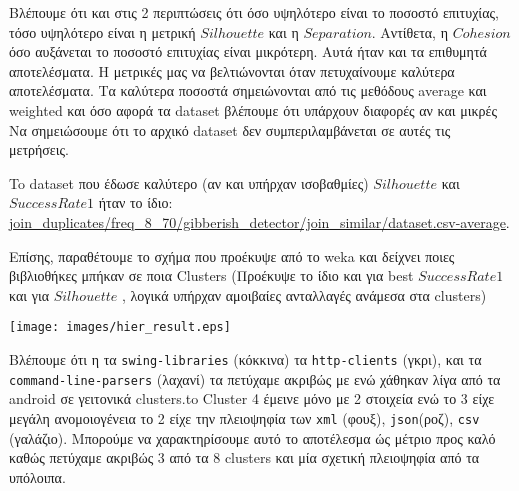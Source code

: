 Βλέπουμε ότι και στις 2 περιπτώσεις ότι όσο υψηλότερο είναι το ποσοστό επιτυχίας,
τόσο υψηλότερο είναι η μετρική $Silhouette$ και η $Separation$.
Αντίθετα, η $Cohesion$ όσο αυξάνεται το ποσοστό επιτυχίας είναι μικρότερη.
Αυτά ήταν και τα επιθυμητά αποτελέσματα.
Η μετρικές μας να βελτιώνονται όταν πετυχαίνουμε καλύτερα αποτελέσματα. 
Τα καλύτερα ποσοστά σημειώνονται από τις μεθόδους average και weighted
και όσο αφορά τα dataset βλέπουμε ότι υπάρχουν διαφορές αν και μικρές
Να σημειώσουμε ότι το αρχικό dataset δεν συμπεριλαμβάνεται σε αυτές τις μετρήσεις.


To dataset που έδωσε καλύτερο (αν και υπήρχαν ισοβαθμίες) $Silhouette$ και $Success Rate 1$ ήταν το ίδιο:
\url{join_duplicates/freq_8_70/gibberish_detector/join_similar/dataset.csv-average}.

\begin{minipage}{\linewidth}
    \centering
    \label{table:best-hier}
\end{minipage}

Επίσης, παραθέτουμε το σχήμα που προέκυψε από το weka και δείχνει ποιες
βιβλιοθήκες μπήκαν σε ποια Clusters (Προέκυψε το ίδιο και για best $Success Rate 1$ και για $Silhouette$ , λογικά υπήρχαν αμοιβαίες ανταλλαγές ανάμεσα στα clusters)

\noindent\begin{minipage}{\linewidth}
    \centering
    \texttt{[image: images/hier\_result.eps]}
    \label{fig:clustering}
\end{minipage}

Βλέπουμε ότι η τα \texttt{swing-libraries} (κόκκινα) τα \texttt{http-clients} (γκρι), 
και τα \texttt{command-line-parsers} (λαχανί) τα πετύχαμε ακριβώς με ενώ χάθηκαν 
λίγα από τα android σε γειτονικά clusters.to Cluster 4 έμεινε μόνο με 2 στοιχεία ενώ το 3 είχε μεγάλη ανομοιογένεια το 2 είχε την πλειοψηφία των \texttt{xml} (φουξ), \texttt{json}(ροζ), \texttt{csv} (γαλάζιο).
Μπορούμε να χαρακτηρίσουμε αυτό το αποτέλεσμα ώς μέτριο προς καλό
καθώς πετύχαμε ακριβώς 3 από τα 8 clusters και μία σχετική πλειοψηφία από τα υπόλοιπα.

